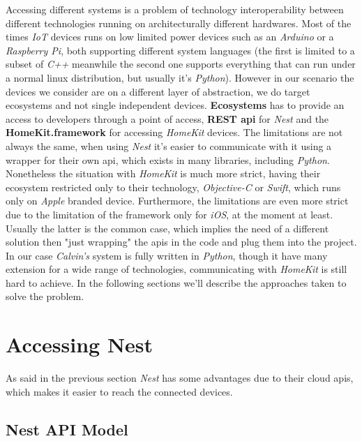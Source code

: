 Accessing different systems is a problem of technology interoperability between
different technologies running on architecturally different hardwares.
Most of the times \textit{IoT} devices runs on low limited power devices such as
an \textit{Arduino} or a \textit{Raspberry Pi}, both supporting different system
languages (the first is limited to a subset of \textit{C++} meanwhile the second one supports everything
that can run under a normal linux distribution, but usually it's \textit{Python}).
However in our scenario the devices we consider are on a different layer of abstraction,
we do target ecosystems and not single independent devices. \textbf{Ecosystems} has to
provide an access to developers through a point of access, \textbf{REST api} for   \textit{Nest}
and the \textbf{HomeKit.framework} for accessing \textit{HomeKit} devices.
The limitations are not always the same, when using \textit{Nest} it's easier to communicate
with it using a wrapper for their own api, which exists in many libraries, including \textit{Python}.
Nonetheless the situation with \textit{HomeKit} is much more strict, having their ecosystem
restricted only to their technology, \textit{Objective-C} or \textit{Swift}, which runs only
on \textit{Apple} branded device. Furthermore, the limitations are even more strict
due to the limitation of the framework only for \textit{iOS}, at the moment at least.
Usually the latter is the common case, which implies the need of a different solution
then "just wrapping" the apis in the code and plug them into the project.
In our case \textit{Calvin's} system is fully written in \textit{Python},
though it have many extension for a wide range of technologies, communicating
with \textit{HomeKit} is still hard to achieve.
In the following sections we'll describe the approaches taken to solve
the problem.


\section{Accessing Nest}

As said in the previous section \textit{Nest} has some advantages
due to their cloud apis, which makes it easier to reach the connected devices.

\subsection{Nest API Model}

